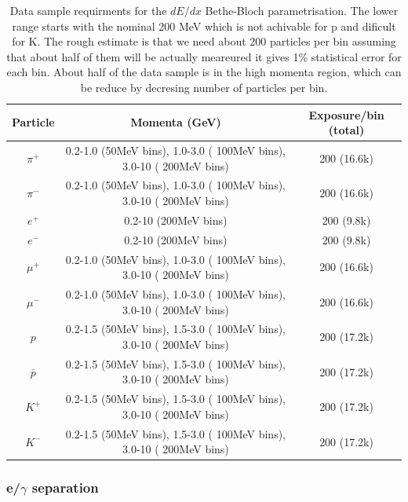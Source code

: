 \begin{table}[h]
\centering
\begin{tabular}{|c|c|c|}
\hline
Particle     & Momenta (GeV)                                                                                       & Exposure/bin (total)  \\ \hline
$\pi ^+ $   & 0.2-1.0 (50MeV bins), 1.0-3.0 ( 100MeV bins), 3.0-10 ( 200MeV bins)    &  200 (16.6k)     \\ \hline
$\pi ^- $    & 0.2-1.0 (50MeV bins), 1.0-3.0 ( 100MeV bins), 3.0-10 ( 200MeV bins)    &  200 (16.6k)     \\ \hline
$e^+$       & 0.2-10  (200MeV bins)                                                                              &  200 (9.8k)        \\ \hline
$e^- $       & 0.2-10  (200MeV bins)                                                                              &  200 (9.8k)        \\ \hline
$\mu^+$   & 0.2-1.0 (50MeV bins), 1.0-3.0 ( 100MeV bins), 3.0-10 ( 200MeV bins)    &  200 (16.6k)    \\ \hline
$\mu^-$    & 0.2-1.0 (50MeV bins), 1.0-3.0 ( 100MeV bins), 3.0-10 ( 200MeV bins)    &  200 (16.6k)     \\ \hline
$p$          &  0.2-1.5 (50MeV bins), 1.5-3.0 ( 100MeV bins), 3.0-10 ( 200MeV bins)    &  200 (17.2k)     \\ \hline
$\bar p$   &  0.2-1.5 (50MeV bins), 1.5-3.0 ( 100MeV bins), 3.0-10 ( 200MeV bins)    &  200 (17.2k)    \\ \hline
$K^+$      &  0.2-1.5 (50MeV bins), 1.5-3.0 ( 100MeV bins), 3.0-10 ( 200MeV bins)    &  200 (17.2k)      \\ \hline
$K^- $      &  0.2-1.5 (50MeV bins), 1.5-3.0 ( 100MeV bins), 3.0-10 ( 200MeV bins)    &  200 (17.2k)    \\ \hline
\end{tabular}\caption{Data sample requirments for the $dE/dx$ Bethe-Bloch parametrisation. The lower range starts with the nominal 200 MeV which is not achivable for p and dificult for K. The rough estimate is that we need about 200 particles per bin assuming that about half of them will be actually meareured it gives  1\% statistical error for each bin. About half of the data sample is in the high momenta region, which can be reduce by decresing number of particles per bin. }
\end{table}




\subsubsection{e/$\gamma$ separation}

